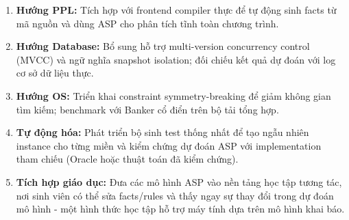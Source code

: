 \documentclass[a4paper,11pt]{article}
\begin{document}
\begin{enumerate}
    \item \textbf{Hướng PPL:} Tích hợp với frontend compiler thực để tự động sinh facts
      từ mã nguồn và dùng ASP cho phân tích tĩnh toàn chương trình.
  
    \item \textbf{Hướng Database:} Bổ sung hỗ trợ multi-version concurrency control (MVCC)
      và ngữ nghĩa snapshot isolation; đối chiếu kết quả dự đoán với log cơ sở dữ liệu thực.
  
    \item \textbf{Hướng OS:} Triển khai constraint symmetry-breaking để giảm không gian tìm kiếm;
      benchmark với Banker cổ điển trên bộ tải tổng hợp.
  
    \item \textbf{Tự động hóa:} Phát triển bộ sinh test thống nhất để tạo ngẫu nhiên instance cho từng miền
      và kiểm chứng dự đoán ASP với implementation tham chiếu (Oracle hoặc thuật toán đã kiểm chứng).
  
    \item \textbf{Tích hợp giáo dục:} Đưa các mô hình ASP vào nền tảng học tập tương tác, nơi sinh viên
      có thể sửa facts/rules và thấy ngay sự thay đổi trong dự đoán mô hình - một hình thức
      học tập hỗ trợ máy tính dựa trên mô hình khai báo.
\end{enumerate}
\end{document}
